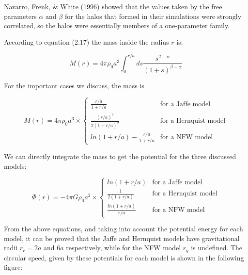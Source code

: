 Navarro, Frenk, \& White (1996) showed that the values taken by the free parameters $\alpha$ and $\beta$ for the halos that formed in their simulations were strongly correlated, so the halos were essentially members of a one-parameter family. 

According to equation (2.17) the mass inside the radius $r$ is:

\begin{equation}
M(r)=4\pi \rho_{0}a^{3}\int_{0}^{r/a}ds\frac{s^{2-\alpha}}{(1+s)^{\beta-\alpha}}
\end{equation}

For the important cases we discuss, the mass is

\begin{equation}
M(r) = 4\pi \rho_{0}a^{3} \times \left\lbrace
\begin{array}{lll}
\frac{r/a}{1+r/a} & \text{for a Jaffe model}\\
\frac{(r/a)^{2}}{2(1+r/a)^{2}} & \text{for a Hernquist model}\\
ln(1+r/a)-\frac{r/a}{1+r/a} & \text{for a NFW model}
\end{array}
\right.
\end{equation} 

We can directly integrate the mass to get the potential for the three discussed models:

\begin{equation}
\Phi(r) = -4\pi G\rho_{0}a^{2} \times \left\lbrace
\begin{array}{lll}
ln(1+r/a) & \text{for a Jaffe model}\\
\frac{1}{2(1+r/a)} & \text{for a Hernquist model}\\
\frac{ln(1+r/a)}{r/a} & \text{for a NFW model}
\end{array}
\right.
\end{equation} 

From the above equations, and taking into account the potential energy for each model, it can be proved that the Jaffe and Hernquist models have gravitational radii $r_{r}=2a$ and $6a$ respectively, while for the NFW model $r_{g}$ is undefined. The circular speed, given by these potentials for each model is shown in the following figure: 

